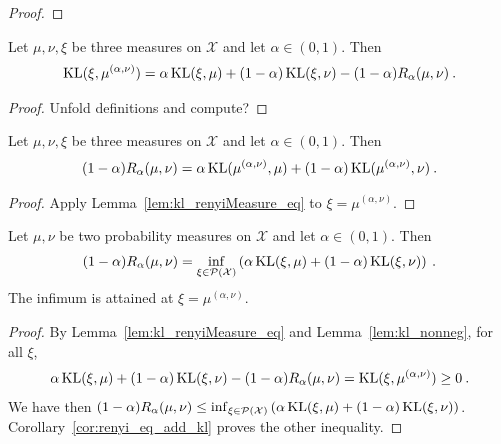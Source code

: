 \begin{proof}%
{}

\end{proof}

\begin{lemma}
  \label{lem:kl_renyiMeasure_eq}
  Let $\mu, \nu, \xi$ be three measures on $\mathcal X$ and let $\alpha \in (0, 1)$. Then
  \begin{align*}
  \operatorname{KL}(\xi, \mu^{(\alpha, \nu)}) = \alpha \operatorname{KL}(\xi, \mu) + (1 - \alpha)\operatorname{KL}(\xi, \nu) - (1 - \alpha) R_\alpha(\mu, \nu) \: .
  \end{align*}
\end{lemma}

\begin{proof}
Unfold definitions and compute?
\end{proof}

\begin{corollary}
  \label{cor:renyi_eq_add_kl}
  Let $\mu, \nu, \xi$ be three measures on $\mathcal X$ and let $\alpha \in (0, 1)$. Then
  \begin{align*}
  (1 - \alpha) R_\alpha(\mu, \nu) = \alpha \operatorname{KL}(\mu^{(\alpha, \nu)}, \mu) + (1 - \alpha)\operatorname{KL}(\mu^{(\alpha, \nu)}, \nu) \: .
  \end{align*}
\end{corollary}

\begin{proof}
Apply Lemma~\ref{lem:kl_renyiMeasure_eq} to $\xi = \mu^{(\alpha, \nu)}$.
\end{proof}

\begin{lemma}
  \label{lem:renyi_eq_inf_add_kl}
  Let $\mu, \nu$ be two probability measures on $\mathcal X$ and let $\alpha \in (0, 1)$. Then
  \begin{align*}
  (1 - \alpha) R_\alpha(\mu, \nu) = \inf_{\xi \in \mathcal P(\mathcal X)}\left( \alpha \operatorname{KL}(\xi, \mu) + (1 - \alpha)\operatorname{KL}(\xi, \nu) \right) \: .
  \end{align*}
  The infimum is attained at $\xi = \mu^{(\alpha, \nu)}$.
\end{lemma}

\begin{proof}
By Lemma~\ref{lem:kl_renyiMeasure_eq} and Lemma~\ref{lem:kl_nonneg}, for all $\xi$,
\begin{align*}
\alpha \operatorname{KL}(\xi, \mu) + (1 - \alpha)\operatorname{KL}(\xi, \nu) - (1 - \alpha) R_\alpha(\mu, \nu)
= \operatorname{KL}(\xi, \mu^{(\alpha, \nu)})
\ge 0 \: .
\end{align*}
We have then $(1 - \alpha) R_\alpha(\mu, \nu) \le \inf_{\xi \in \mathcal P(\mathcal X)}\left( \alpha \operatorname{KL}(\xi, \mu) + (1 - \alpha)\operatorname{KL}(\xi, \nu) \right)$.
Corollary~\ref{cor:renyi_eq_add_kl} proves the other inequality.
\end{proof}


